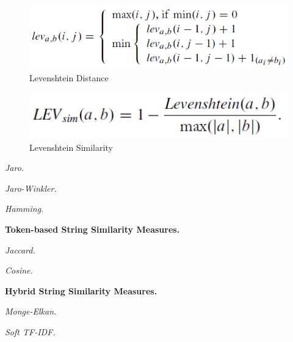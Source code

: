 \begin{figure}
	\begin{center}
	\includegraphics[width=13cm]{./figures/LevenshteinDistance.PNG}
	\caption[Levenshtein Distance]{Levenshtein Distance \cite{VassilisChristophides2015EntityRI-P25-28}}
	\label{fig:Levenshtein Distance}
	\end{center}
\end{figure}

\begin{figure}
	\begin{center}
	\includegraphics[width=13cm]{./figures/LevenshteinSimilarity.PNG}
	\caption[Levenshtein Similarity]{Levenshtein Similarity \cite{VassilisChristophides2015EntityRI-P25-28}}
	\label{fig:Levenshtein Similarity}
	\end{center}
\end{figure}

\textit{Jaro.}

\textit{Jaro-Winkler.}

\textit{Hamming.}

\textbf{Token-based String Similarity Measures.}


\textit{Jaccard.}

\textit{Cosine.}

\textbf{Hybrid String Similarity Measures.}

\textit{Monge-Elkan.}

\textit{Soft TF-IDF.}

